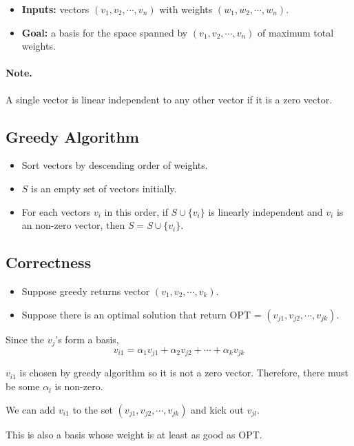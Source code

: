 \begin{itemize}
	\item \textbf{Inputs:} vectors $(v_1, v_2, \cdots, v_n)$ with weights 
$(w_1, w_2, \cdots, w_n)$.
    \item \textbf{Goal:} a basis for the space spanned by $(v_1, v_2, \cdots, 
v_n)$ of maximum total weights.
\end{itemize}
\paragraph{Note.} A single vector is linear independent to any other vector if 
it is a zero vector.

\subsection{Greedy Algorithm}
\begin{itemize}
	\item Sort vectors by descending order of weights.
	\item $S$ is an empty set of vectors initially.
	\item For each vectors $v_i$ in this order, if $S \cup \{v_i\}$ is linearly 
independent and $v_i$ is an non-zero vector, then $S = S \cup \{v_i\}$.
\end{itemize}

\subsection{Correctness}
\begin{itemize}
	\item Suppose greedy returns vector $(v_1, v_2, \cdots, v_k)$.
	\item Suppose there is an optimal solution that return OPT = $(v_{j1}, 
v_{j2}, \cdots, v_{jk})$.
\end{itemize}

Since the $v_j$'s form a basis,
\[v_{i1} = \alpha_1 v_{j1} + \alpha_2 v_{j2} + \cdots + \alpha_k v_{jk}\]

$v_{i1}$ is chosen by greedy algorithm so it is not a zero vector. Therefore, 
there must be some $\alpha_l$ is non-zero.

We can add $v_{i1}$ to the set $(v_{j1}, v_{j2}, \cdots, v_{jk})$ and kick out 
$v_{jl}$.

\begin{claim}{}
	This is also a basis whose weight is at least as good as OPT.
\end{claim}
